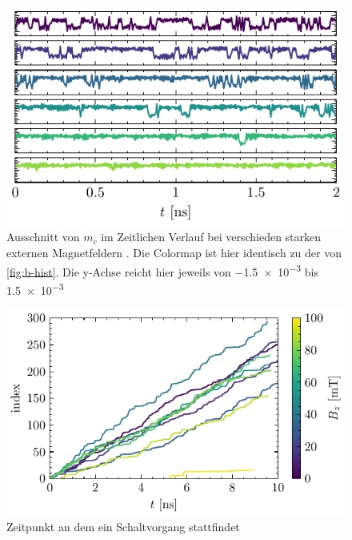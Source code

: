 \documentclass[main.tex]{subfiles}
\begin{document}



\begin{figure}[H]
    \centering
    \includegraphics{bilder/plots/max_Bz/mc_time.pdf}
    \caption{Ausschnitt von \(m_c\) im Zeitlichen Verlauf bei verschieden starken externen Magnetfeldern . Die Colormap ist hier identisch zu der von \cref{fig:b-hist}. Die y-Achse reicht hier jeweils von \num{-1.5e-3} bis \num{+1.5e-3}}\label{fig:b-time}    
\end{figure}

\begin{figure}[H]
    \centering
    \includegraphics{bilder/plots/max_Bz/switch_events.pdf}
    \caption{Zeitpunkt an dem ein Schaltvorgang stattfindet}\label{fig:bz-switch-events}   
\end{figure}
\end{document}
